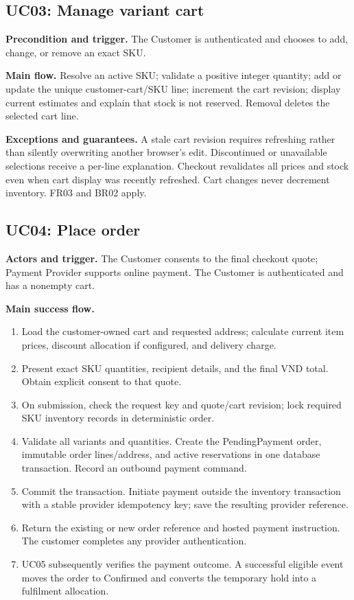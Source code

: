 \subsection{UC03: Manage variant cart}
\textbf{Precondition and trigger.} The Customer is authenticated and chooses to add, change, or remove an exact SKU.

\textbf{Main flow.} Resolve an active SKU; validate a positive integer quantity; add or update the unique customer-cart/SKU line; increment the cart revision; display current estimates and explain that stock is not reserved. Removal deletes the selected cart line.

\textbf{Exceptions and guarantees.} A stale cart revision requires refreshing rather than silently overwriting another browser's edit. Discontinued or unavailable selections receive a per-line explanation. Checkout revalidates all prices and stock even when cart display was recently refreshed. Cart changes never decrement inventory. FR03 and BR02 apply.

\subsection{UC04: Place order}
\textbf{Actors and trigger.} The Customer consents to the final checkout quote; Payment Provider supports online payment. The Customer is authenticated and has a nonempty cart.

\textbf{Main success flow.}
\begin{enumerate}[nosep]
\item Load the customer-owned cart and requested address; calculate current item prices, discount allocation if configured, and delivery charge.
\item Present exact SKU quantities, recipient details, and the final VND total. Obtain explicit consent to that quote.
\item On submission, check the request key and quote/cart revision; lock required SKU inventory records in deterministic order.
\item Validate all variants and quantities. Create the PendingPayment order, immutable order lines/address, and active reservations in one database transaction. Record an outbound payment command.
\item Commit the transaction. Initiate payment outside the inventory transaction with a stable provider idempotency key; save the resulting provider reference.
\item Return the existing or new order reference and hosted payment instruction. The customer completes any provider authentication.
\item UC05 subsequently verifies the payment outcome. A successful eligible event moves the order to Confirmed and converts the temporary hold into a fulfilment allocation.
\end{enumerate}


